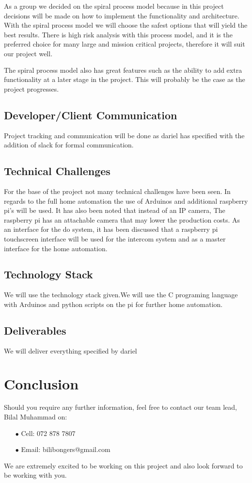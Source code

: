 \documentclass[a4paper,12pt]{article}
\begin{document}
	{\noindent}As a group we decided on the spiral process model because in this project decisions will be made on how to implement the functionality and architecture. With the spiral process model we will choose the safest options that will yield the best results. There is high risk analysis with this process model, and it is the preferred choice for many large and mission critical projects, therefore it will suit our project well.

	{\noindent}The spiral process model also has great features such as the ability to add extra functionality at a later stage in the project. This will probably be the case as the project progresses.

	\subsection{Developer/Client Communication}
	Project tracking and communication will be done as dariel has specified with the addition of slack for formal communication. 

	\subsection{Technical Challenges}
	For the base of the project not many technical challenges have been seen. In regards to the full home automation the use of Arduinos and additional raspberry pi's will be used. It has also been noted that instead of an IP camera, The raspberry pi has an attachable camera that may lower the production costs. As an interface for the do system, it has been discussed that a raspberry pi touchscreen interface will be used for the intercom system and as a master interface for the home automation.

	\subsection{Technology Stack}
	We will use the technology stack given.We will use the C programing language with Arduinos and python scripts on the pi for further home automation.

	\subsection{Deliverables}
	We will deliver everything specified by dariel
	

	\section{Conclusion}
	
	Should you require any further information, feel free to contact our team lead, Bilal Muhammad on:
	
	\begin{itemize}
		\item[$\bullet$]Cell: 072 878 7807
		\item[$\bullet$]Email: bilibongers@gmail.com
	\end{itemize}
	We are extremely excited to be working on this project and also look forward to be working with you.
	
	
\end{document}
